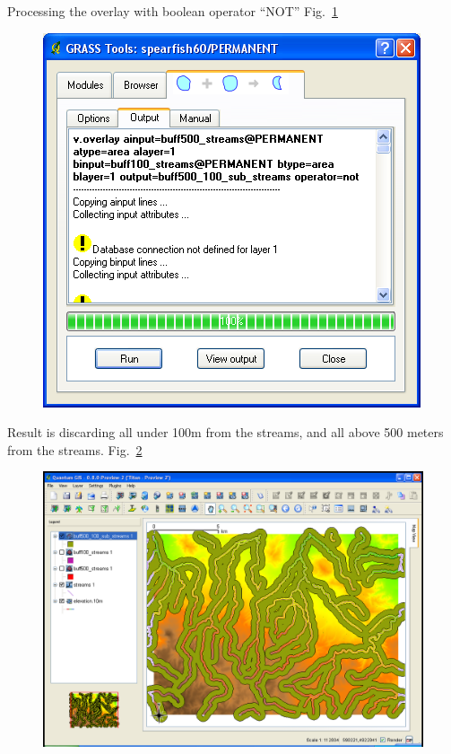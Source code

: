 Processing the overlay with boolean operator ``NOT'' Fig.~\ref{fig:qgis040}

\begin{figure}[htbp]
   \centering
   \includegraphics[scale=0.35]{qgis040.png}
   \caption{}
   \label{fig:qgis040}
\end{figure}

Result is discarding all under 100m from the streams, and all above 500
meters from the streams. Fig.~\ref{fig:qgis041}

\begin{figure}[htbp]
   \centering
   \includegraphics[scale=0.2]{qgis041.png}
   \caption{}
   \label{fig:qgis041}
\end{figure}

